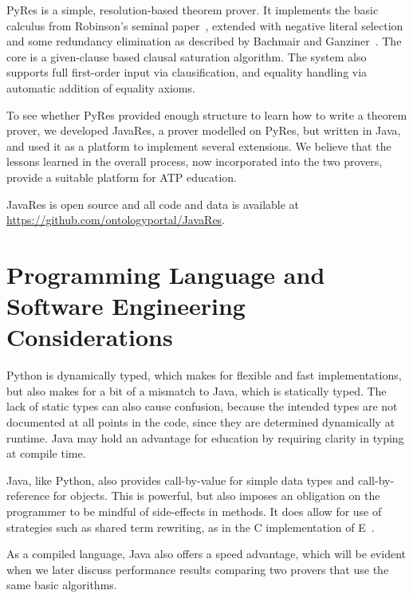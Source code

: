 \documentclass{llncs}
\begin{document}
PyRes is a simple, resolution-based theorem prover. It implements the
basic calculus from Robinson's seminal paper~\cite{Ro65}, extended
with negative literal selection and some redundancy elimination as
described by Bachmair and Ganziner~\cite{BG:HBAR-2001}. The core is a
given-clause based clausal saturation algorithm. The system also
supports full first-order input via clausification, and equality
handling via automatic addition of equality axioms.

To see whether PyRes provided enough structure to learn how to write a
theorem prover, we developed JavaRes, a prover modelled on PyRes, but
written in Java, and used it as a platform to implement several
extensions.  We believe that the lessons learned in the overall
process, now incorporated into the two provers, provide a suitable
platform for ATP education.

JavaRes is open source and all code and data is available at
\url{https://github.com/ontologyportal/JavaRes}.




\section{Programming Language and Software Engineering Considerations}

Python is dynamically typed, which makes for flexible and fast
implementations, but also makes for a bit of a mismatch to Java, which
is statically typed.  The lack of static types can also cause
confusion, because the intended types are not documented at all points
in the code, since they are determined dynamically at runtime.  Java
may hold an advantage for education by requiring clarity in typing at
compile time.

Java, like Python, also provides call-by-value for simple data types
and call-by-reference for objects.  This is powerful, but also imposes
an obligation on the programmer to be mindful of side-effects in
methods.  It does allow for use of strategies such as shared term
rewriting, as in the C implementation of E~\cite{LS:LPAR-WS-2001}.

As a compiled language, Java also offers a speed advantage, which will
be evident when we later discuss performance results comparing two
provers that use the same basic algorithms.
\end{document}
